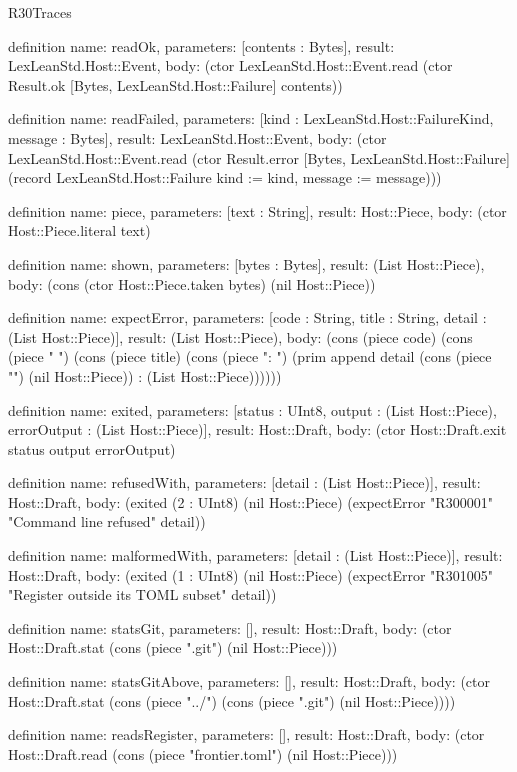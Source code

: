 \begin{lexlean}{R30Traces}
\begin{semanticmodule}
definition{
  name: readOk,
  parameters: [contents : Bytes],
  result: LexLeanStd.Host::Event,
  body: (ctor LexLeanStd.Host::Event.read (ctor Result.ok [Bytes, LexLeanStd.Host::Failure] contents))
}

definition{
  name: readFailed,
  parameters: [kind : LexLeanStd.Host::FailureKind, message : Bytes],
  result: LexLeanStd.Host::Event,
  body: (ctor LexLeanStd.Host::Event.read (ctor Result.error [Bytes, LexLeanStd.Host::Failure] (record LexLeanStd.Host::Failure {kind := kind, message := message})))
}

definition{
  name: piece,
  parameters: [text : String],
  result: Host::Piece,
  body: (ctor Host::Piece.literal text)
}

definition{
  name: shown,
  parameters: [bytes : Bytes],
  result: (List Host::Piece),
  body: (cons (ctor Host::Piece.taken bytes) (nil Host::Piece))
}

definition{
  name: expectError,
  parameters: [code : String, title : String, detail : (List Host::Piece)],
  result: (List Host::Piece),
  body: (cons (piece code) (cons (piece " ") (cons (piece title) (cons (piece ": ") (prim append detail (cons (piece "\n") (nil Host::Piece)) : (List Host::Piece))))))
}

definition{
  name: exited,
  parameters: [status : UInt8, output : (List Host::Piece), errorOutput : (List Host::Piece)],
  result: Host::Draft,
  body: (ctor Host::Draft.exit status output errorOutput)
}

definition{
  name: refusedWith,
  parameters: [detail : (List Host::Piece)],
  result: Host::Draft,
  body: (exited (2 : UInt8) (nil Host::Piece) (expectError "R300001" "Command line refused" detail))
}

definition{
  name: malformedWith,
  parameters: [detail : (List Host::Piece)],
  result: Host::Draft,
  body: (exited (1 : UInt8) (nil Host::Piece) (expectError "R301005" "Register outside its TOML subset" detail))
}

definition{
  name: statsGit,
  parameters: [],
  result: Host::Draft,
  body: (ctor Host::Draft.stat (cons (piece ".git") (nil Host::Piece)))
}

definition{
  name: statsGitAbove,
  parameters: [],
  result: Host::Draft,
  body: (ctor Host::Draft.stat (cons (piece "../") (cons (piece ".git") (nil Host::Piece))))
}

definition{
  name: readsRegister,
  parameters: [],
  result: Host::Draft,
  body: (ctor Host::Draft.read (cons (piece "frontier.toml") (nil Host::Piece)))
}


\end{semanticmodule}
\end{lexlean}
